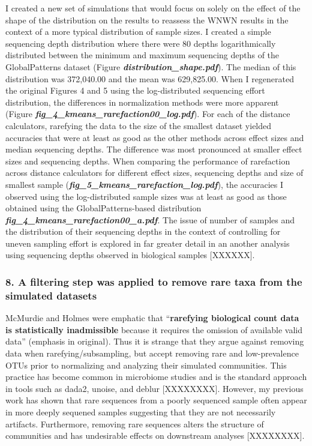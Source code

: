 \documentclass[
]{article}
\begin{document}
I created a new set of simulations that would focus on solely on the
effect of the shape of the distribution on the results to reassess the
WNWN results in the context of a more typical distribution of sample
sizes. I created a simple sequencing depth distribution where there were
80 depths logarithmically distributed between the minimum and maximum
sequencing depths of the GlobalPatterns dataset (Figure
\textbf{\emph{distribution\_shape.pdf}}). The median of this
distribution was 372,040.00 and the mean was 629,825.00. When I
regenerated the original Figures 4 and 5 using the log-distributed
sequencing effort distribution, the differences in normalization methods
were more apparent (Figure
\textbf{\emph{fig\_4\_kmeans\_rarefaction00\_log.pdf}}). For each of the
distance calculators, rarefying the data to the size of the smallest
dataset yielded accuracies that were at least as good as the other
methods across effect sizes and median sequencing depths. The difference
was most pronounced at smaller effect sizes and sequencing depths. When
comparing the performance of rarefaction across distance calculators for
different effect sizes, sequencing depths and size of smallest sample
(\textbf{\emph{fig\_5\_kmeans\_rarefaction\_log.pdf}}), the accuracies I
observed using the log-distributed sample sizes was at least as good as
those obtained using the GlobalPatterns-based distribution
\textbf{\emph{fig\_4\_kmeans\_rarefaction00\_a.pdf}}. The issue of
number of samples and the distribution of their sequencing depths in the
context of controlling for uneven sampling effort is explored in far
greater detail in an another analysis using sequencing depths observed
in biological samples {[}XXXXXX{]}.

\hypertarget{a-filtering-step-was-applied-to-remove-rare-taxa-from-the-simulated-datasets}{%
\subsubsection{8. A filtering step was applied to remove rare taxa from
the simulated
datasets}\label{a-filtering-step-was-applied-to-remove-rare-taxa-from-the-simulated-datasets}}

McMurdie and Holmes were emphatic that ``\textbf{rarefying biological
count data is statistically inadmissible} because it requires the
omission of available valid data'' (emphasis in original). Thus it is
strange that they argue against removing data when
rarefying/subsampling, but accept removing rare and low-prevalence OTUs
prior to normalizing and analyzing their simulated communities. This
practice has become common in microbiome studies and is the standard
approach in tools such as dada2, unoise, and deblur {[}XXXXXXXX{]}.
However, my previous work has shown that rare sequences from a poorly
sequenced sample often appear in more deeply sequened samples suggesting
that they are not necessarily artifacts. Furthermore, removing rare
sequences alters the structure of communities and has undesirable
effects on downstream analyses {[}XXXXXXXX{]}.
\end{document}
